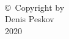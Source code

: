 
\thispagestyle{empty}
\hbox{\ }

\vfill
\renewcommand{\baselinestretch}{1}
\small\normalsize

\vspace{-.65in}

\begin{center}
    \large{\copyright \hbox{ }Copyright by\\
        Denis Peskov  %
        \\
        2020}
\end{center}

\vfill
